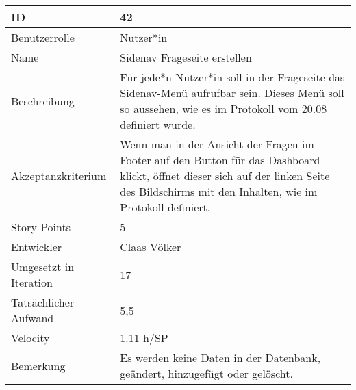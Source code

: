 \begin{tabularx}{\textwidth}{|p{}|X|}
	\hline
	ID & 42 \\
	\hline
	Benutzerrolle & Nutzer*in \\
	\hline
	Name & Sidenav Frageseite erstellen\\
	\hline
	Beschreibung & Für jede*n Nutzer*in soll in der Frageseite das Sidenav-Menü aufrufbar sein. Dieses Menü soll so aussehen, wie es im Protokoll vom 20.08 definiert wurde.\\
	\hline
	Akzeptanzkriterium & Wenn man in der Ansicht der Fragen im Footer auf den Button für das Dashboard klickt, öffnet dieser sich auf der linken Seite des Bildschirms mit den Inhalten, wie im Protokoll definiert. \\
	\hline
	Story Points & 5\\
	\hline
	Entwickler & Claas Völker\\
	\hline
	Umgesetzt in Iteration & 17\\
	\hline
	Tatsächlicher Aufwand & 5,5\\
	\hline
	Velocity & 1.11 h/SP\\
	\hline
	Bemerkung & Es werden keine Daten in der Datenbank, geändert, hinzugefügt oder gelöscht.\\
	\hline
\end{tabularx}
\vspace{20pt}
